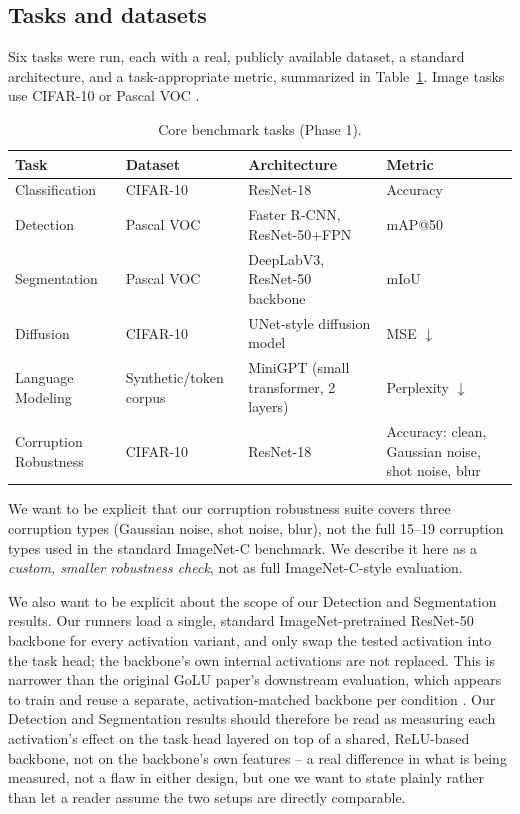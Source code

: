 \documentclass[conference]{IEEEtran}
\begin{document}
\subsection{Tasks and datasets}

Six tasks were run, each with a real, publicly available dataset, a standard architecture, and a task-appropriate metric, summarized in Table~\ref{tab:tasks}. Image tasks use CIFAR-10 \cite{cifar10} or Pascal VOC \cite{pascalvoc}.

\begin{table}[h]
\centering
\caption{Core benchmark tasks (Phase 1).}
\label{tab:tasks}
\begin{tabular}{@{}p{1.5cm}p{1.5cm}p{2.3cm}p{1.2cm}@{}}
\toprule
Task & Dataset & Architecture & Metric \\
\midrule
Classification & CIFAR-10 \cite{cifar10} & ResNet-18 & Accuracy \\
Detection & Pascal VOC \cite{pascalvoc} & Faster R-CNN, ResNet-50+FPN & mAP@50 \\
Segmentation & Pascal VOC \cite{pascalvoc} & DeepLabV3, ResNet-50 backbone & mIoU \\
Diffusion & CIFAR-10 \cite{cifar10} & UNet-style diffusion model & MSE $\downarrow$ \\
Language Modeling & Synthetic/token corpus & MiniGPT (small transformer, 2 layers) & Perplexity $\downarrow$ \\
Corruption Robustness & CIFAR-10 \cite{cifar10} & ResNet-18 & Accuracy: clean, Gaussian noise, shot noise, blur \\
\bottomrule
\end{tabular}
\end{table}

We want to be explicit that our corruption robustness suite covers three corruption types (Gaussian noise, shot noise, blur), not the full 15--19 corruption types used in the standard ImageNet-C benchmark. We describe it here as a \emph{custom, smaller robustness check}, not as full ImageNet-C-style evaluation.

We also want to be explicit about the scope of our Detection and Segmentation results. Our runners load a single, standard ImageNet-pretrained ResNet-50 backbone for every activation variant, and only swap the tested activation into the task head; the backbone's own internal activations are not replaced. This is narrower than the original GoLU paper's downstream evaluation, which appears to train and reuse a separate, activation-matched backbone per condition \cite{golu2025}. Our Detection and Segmentation results should therefore be read as measuring each activation's effect on the task head layered on top of a shared, ReLU-based backbone, not on the backbone's own features -- a real difference in what is being measured, not a flaw in either design, but one we want to state plainly rather than let a reader assume the two setups are directly comparable.
\end{document}
